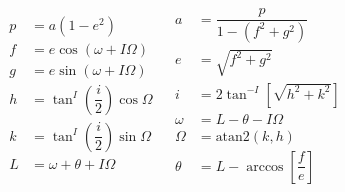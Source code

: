 %
%


\begin{align} \label{eq:keplttomee_and_meetokepl}
\begin{split}
p&=a\left(1-e^{2}\right)\\
f&=e\cos\left(\omega+I\Omega\right)\\
g&=e\sin\left(\omega+I\Omega\right)\\
h&=\tan^{I}\left(\dfrac{i}{2}\right)\cos\Omega\\
k&=\tan^{I}\left(\dfrac{i}{2}\right)\sin\Omega\\
L&=\omega+\theta+I\Omega\\
\end{split}
&
\begin{split}
a&=\dfrac{p}{1-\left(f^{2}+g^{2}\right)}\\
e&=\sqrt{f^{2}+g^{2}}\\
i&=2\tan^{-I}\left[\sqrt{h^{2}+k^{2}}\right]\\
\omega&=L-\theta-I\Omega\\
\Omega&=\text{atan}2\left(k,h\right)\\
\theta&=L-\arccos\left[\dfrac{f}{e}\right]
\end{split}
\end{align}





